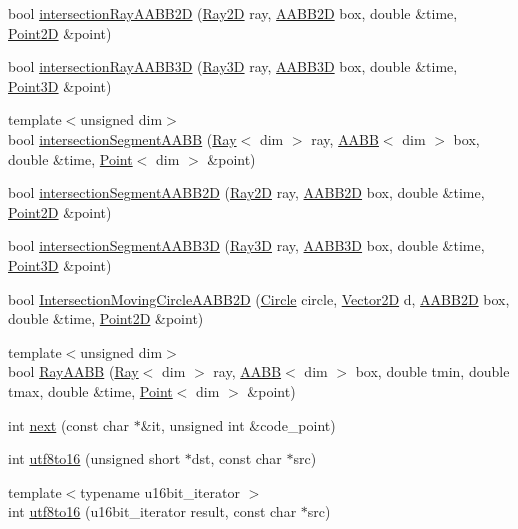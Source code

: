 \begin{DoxyCompactItemize}
\item 
bool \hyperlink{namespacezbe_a0684473ae5bb50303b93fbf1ea800990}{intersection\+Ray\+A\+A\+B\+B2\+D} (\hyperlink{structzbe_1_1_ray2_d}{Ray2\+D} ray, \hyperlink{structzbe_1_1_a_a_b_b2_d}{A\+A\+B\+B2\+D} box, double \&time, \hyperlink{classzbe_1_1_point2_d}{Point2\+D} \&point)
\item 
bool \hyperlink{namespacezbe_ae32604921c6c169643a1c807ada77ab1}{intersection\+Ray\+A\+A\+B\+B3\+D} (\hyperlink{structzbe_1_1_ray3_d}{Ray3\+D} ray, \hyperlink{structzbe_1_1_a_a_b_b3_d}{A\+A\+B\+B3\+D} box, double \&time, \hyperlink{classzbe_1_1_point3_d}{Point3\+D} \&point)
\item 
{\footnotesize template$<$unsigned dim$>$ }\\bool \hyperlink{namespacezbe_ab6f7d7861525788a9c123c3ba04ecb3f}{intersection\+Segment\+A\+A\+B\+B} (\hyperlink{structzbe_1_1_ray}{Ray}$<$ dim $>$ ray, \hyperlink{structzbe_1_1_a_a_b_b}{A\+A\+B\+B}$<$ dim $>$ box, double \&time, \hyperlink{classzbe_1_1_point}{Point}$<$ dim $>$ \&point)
\item 
bool \hyperlink{namespacezbe_a9f6932d918cf0e4187a1f0bf4ac4a58e}{intersection\+Segment\+A\+A\+B\+B2\+D} (\hyperlink{structzbe_1_1_ray2_d}{Ray2\+D} ray, \hyperlink{structzbe_1_1_a_a_b_b2_d}{A\+A\+B\+B2\+D} box, double \&time, \hyperlink{classzbe_1_1_point2_d}{Point2\+D} \&point)
\item 
bool \hyperlink{namespacezbe_a77c37d3bb4edc9d4736ee344fb064150}{intersection\+Segment\+A\+A\+B\+B3\+D} (\hyperlink{structzbe_1_1_ray3_d}{Ray3\+D} ray, \hyperlink{structzbe_1_1_a_a_b_b3_d}{A\+A\+B\+B3\+D} box, double \&time, \hyperlink{classzbe_1_1_point3_d}{Point3\+D} \&point)
\item 
bool \hyperlink{namespacezbe_ac73f82f5a353978659602cc2532074aa}{Intersection\+Moving\+Circle\+A\+A\+B\+B2\+D} (\hyperlink{structzbe_1_1_circle}{Circle} circle, \hyperlink{classzbe_1_1_vector2_d}{Vector2\+D} d, \hyperlink{structzbe_1_1_a_a_b_b2_d}{A\+A\+B\+B2\+D} box, double \&time, \hyperlink{classzbe_1_1_point2_d}{Point2\+D} \&point)
\item 
{\footnotesize template$<$unsigned dim$>$ }\\bool \hyperlink{namespacezbe_ab8a4e54917626ba3695877b0b794cd29}{Ray\+A\+A\+B\+B} (\hyperlink{structzbe_1_1_ray}{Ray}$<$ dim $>$ ray, \hyperlink{structzbe_1_1_a_a_b_b}{A\+A\+B\+B}$<$ dim $>$ box, double tmin, double tmax, double \&time, \hyperlink{classzbe_1_1_point}{Point}$<$ dim $>$ \&point)
\item 
int \hyperlink{namespacezbe_acd6991877d6abe58ace979bfd37b7fea}{next} (const char $\ast$\&it, unsigned int \&code\+\_\+point)
\item 
int \hyperlink{namespacezbe_a0d3c3c34e3b9b33a36fec13a32445888}{utf8to16} (unsigned short $\ast$dst, const char $\ast$src)
\item 
{\footnotesize template$<$typename u16bit\+\_\+iterator $>$ }\\int \hyperlink{namespacezbe_ac2e9dac736cfb1dda0601d69e411acec}{utf8to16} (u16bit\+\_\+iterator result, const char $\ast$src)
\end{DoxyCompactItemize}
